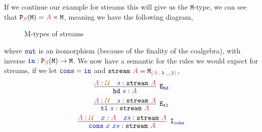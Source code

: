 \documentclass[twoside,11pt,openright]{report}
\newcommand*{\term}[1]{\textcolor{blue!80!black}{#1}}
\newcommand*{\type}[1]{\textcolor{magenta!90!black}{#1}}
\newcommand*{\container}[1]{\textcolor{red}{#1}}
\newcommand*{\containerpair}[2]{\textcolor{red}{(}#1\,\textcolor{red}{,}\,#2\textcolor{red}{)}}
\newcommand*{\universe}[1]{\textcolor{orange!80!black}{#1}}
\newcommand*{\unit}{\type{\textbf{1}}}
\newcommand*{\function}[1]{\textcolor{blue!60!black}{\ensuremath{\mathtt{#1}}}}
\newcommand*{\typeformer}[1]{\ensuremath{\mathtt{#1}}}
\newcommand*{\functor}[1]{\ensuremath{\mathbf{\mathtt{#1}}}}
\begin{document}
\\ \\
If we continue our example for streams this will give us the \(\mathtt{M}\)-type, we can see that \(\functor{P}_{\container{S}}(\typeformer{M}) = \type{A} \times \typeformer{M}\), meaning we have the following diagram,
\begin{figure}[h]
  \centering
  \caption{M-types of streams}
\end{figure}
where \(\function{out}\) is an isomorphism (because of the finality of the coalgebra), with inverse \(\function{in} : \functor{P}_{\container{S}}(\typeformer{M}) \rightarrow \typeformer{M}\). We now have a semantic for the rules we would expect for streams, if we let \(\function{cons} = \function{in}\) and \(\typeformer{stream}~\type{A} = \typeformer{M}_{\containerpair{\type{A}}{\lambda\,\_,\unit}}\),
\begin{equation}
  \infer[\mathtt{E}_{\function{hd}}]{\function{hd}~\term{s} : \type{A}}{\type{A} : \universe{\mathcal{U}} & \term{s} : \typeformer{stream}~\type{A}}
\end{equation}
\begin{equation}
  \infer[\mathtt{E}_{\function{tl}}]{\function{tl}~\term{s} : \typeformer{stream}~\type{A}}{\type{A} : \universe{\mathcal{U}} & \term{s} : \typeformer{stream}~\type{A}}
\end{equation}
\begin{equation}
  \infer[\mathtt{I}_{\function{cons}}]{\term{\function{cons}}~\term{x}~\term{xs} : \typeformer{stream}~\type{A}}{\type{A} : \universe{\mathcal{U}} & \term{x} : \type{A} & \term{xs} : \typeformer{stream}~\type{A}}
\end{equation}
\end{document}
